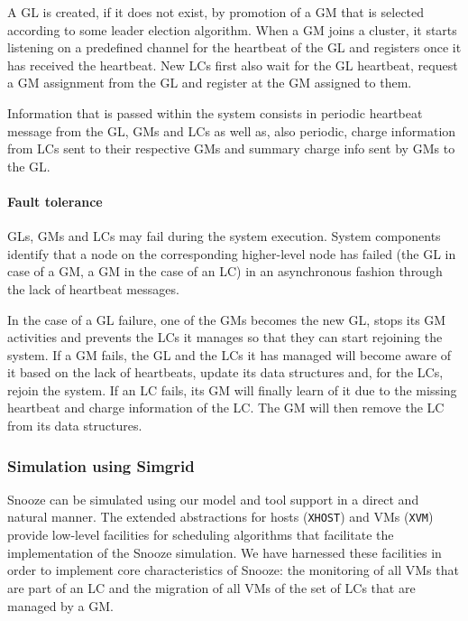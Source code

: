 A GL is created, if it does not exist, by promotion of a GM that is
selected according to some leader election algorithm. When a GM joins
a cluster, it starts listening on a predefined channel for the
heartbeat of the GL and registers once it has received the
heartbeat. New LCs first also wait for the GL heartbeat, request a GM
assignment from the GL and register at the GM assigned to them.

Information that is passed within the system consists in periodic
heartbeat message from the GL, GMs and LCs as well as, also periodic,
charge information from LCs sent to their respective GMs and summary
charge info sent by GMs to the GL.


\paragraph{Fault tolerance} 

GLs, GMs and LCs may fail during the system execution. System
components identify that a node on the corresponding higher-level node
has failed (the GL in case of a GM, a GM in the case of an LC) in an
asynchronous fashion through the lack of heartbeat messages.

In the case of a GL failure, one of the GMs becomes the new GL, stops
its GM activities and prevents the LCs it manages so that they can
start rejoining the system. If a GM fails, the GL and the LCs it has
managed will become aware of it based on the lack of heartbeats,
update its data structures and, for the LCs, rejoin the system. If an
LC fails, its GM will finally learn of it due to the missing heartbeat
and charge information of the LC. The GM will then remove the LC from
its data structures.

\subsubsection{Simulation using Simgrid}

Snooze can be simulated using our model and tool support in a direct
and natural manner. The extended abstractions  for hosts (\texttt{XHOST}) and VMs
(\texttt{XVM}) provide low-level facilities for scheduling algorithms
that facilitate the implementation of the Snooze simulation. We have
harnessed these facilities in order to implement core characteristics
of Snooze: the monitoring of all VMs that are part of an LC and the
migration of all VMs of the set of LCs that are managed by a GM.

